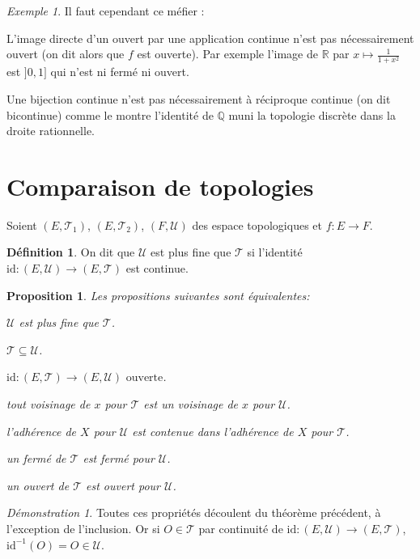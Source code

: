 \documentclass[a4paper, 11pt, french]{book}
\newenvironment{itemise}{\itemize}{\enditemize}
\theoremstyle{plain} %
\newtheorem{proposition}{Proposition}
\theoremstyle{definition} %
\newtheorem{definition}{Définition}
\theoremstyle{remark} %
\newtheorem{exemple}{Exemple}
\newtheorem*{demonstration}{Démonstration}
\newcommand{\1}{\mathds{1}}
\newcommand{\id}{\mathrm{id}}
\newcommand{\inv}[1]{#1^{-1}}
\newcommand{\Q}{\mathbb{Q}}
\newcommand{\R}{\mathbb{R}}
\begin{document}
\begin{exemple}
	Il faut cependant ce méfier :
	\begin{itemise}
		\item L'image directe d'un ouvert par une application continue n'est pas nécessairement ouvert (on dit alors que $f$ est ouverte).
		Par exemple l'image de $\R$ par $x\mapsto\frac{1}{1+x^2}$ est $]0,1]$ qui n'est ni fermé ni ouvert.
		\item Une bijection continue n'est pas nécessairement à réciproque continue (on dit bicontinue) comme le montre l'identité de $\Q$ muni la topologie discrète dans la droite rationnelle.
	\end{itemise}
\end{exemple}

\section{Comparaison de topologies}

Soient $(E, \mathscr{T}_1)$, $(E, \mathscr{T}_2)$, $(F, \mathscr{U})$ des espace topologiques et $f\colon E\rightarrow F$.

\begin{definition}
	On dit que $\mathscr{U}$ est plus fine que $\mathscr{T}$ si l'identité $\id\colon(E, \mathscr{U})\rightarrow(E, \mathscr{T})$ est continue.
\end{definition}

\begin{proposition}
	Les propositions suivantes sont équivalentes:
	\begin{itemise}
		\item $\mathscr{U}$ est plus fine que $\mathscr{T}$.
		\item $\mathscr{T}\subseteq\mathscr{U}$.
		\item $\id\colon(E, \mathscr{T})\rightarrow(E, \mathscr{U})\text{ ouverte}$.
		\item tout voisinage de $x$ pour $\mathscr{T}$ est un voisinage de $x$ pour $\mathscr{U}$.
		\item l'adhérence de $X$ pour $\mathscr{U}$ est contenue dans l'adhérence de $X$ pour $\mathscr{T}$.
		\item un fermé de $\mathscr{T}$ est fermé pour $\mathscr{U}$.
		\item un ouvert de $\mathscr{T}$ est ouvert pour $\mathscr{U}$.
	\end{itemise}
\end{proposition}

\begin{demonstration}
	Toutes ces propriétés découlent du théorème précédent, à l'exception de l'inclusion.
	Or si $O\in\mathscr{T}$ par continuité de $\id\colon(E, \mathscr{U})\rightarrow(E, \mathscr{T})$, $\inv{\id}(O)=O\in\mathscr{U}$.
\end{demonstration}
\end{document}
